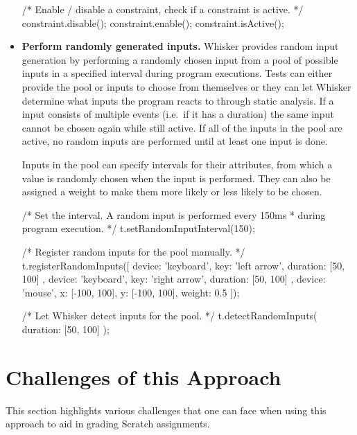 \begin{itemize}
\begin{javascriptcode}
            /* Enable / disable a constraint, check if a constraint is active. */
            constraint.disable();
            constraint.enable();
            constraint.isActive();
        \end{javascriptcode}
    \item \textbf{Perform randomly generated inputs.}
        Whisker provides random input generation by performing a randomly chosen input from a pool of possible inputs
        in a specified interval during program executions.
        Tests can either provide the pool or inputs to choose from themselves
        or they can let Whisker determine what inputs the program reacts to through static analysis.
        If a input consists of multiple events (i.e.\ if it has a duration) the same input cannot be chosen again while still active.
        If all of the inputs in the pool are active, no random inputs are performed until at least one input is done.

        Inputs in the pool can specify intervals for their attributes,
        from which a value is randomly chosen when the input is performed.
        They can also be assigned a weight to make them more likely or less likely to be chosen.
        \begin{javascriptcode}
            /* Set the interval. A random input is performed every 150ms
             * during program execution. */
            t.setRandomInputInterval(150);

            /* Register random inputs for the pool manually. */
            t.registerRandomInputs([
                  { device: 'keyboard', key: 'left arrow', duration: [50, 100] },
                  { device: 'keyboard', key: 'right arrow', duration: [50, 100] },
                  { device: 'mouse', x: [-100, 100], y: [-100, 100], weight: 0.5 }
            ]);

            /* Let Whisker detect inputs for the pool. */
            t.detectRandomInputs({ duration: [50, 100] });
        \end{javascriptcode}
\end{itemize}
\parspace

\section{Challenges of this Approach}
\label{sec:appraoch_challenges}

This section highlights various challenges that one can face when using this approach to aid in grading Scratch assignments.%
\parspace

